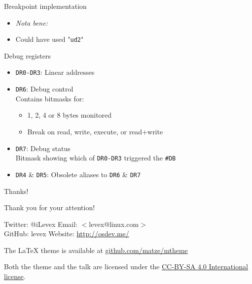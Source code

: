 \documentclass{beamer} %
\makeatletter
\newcommand*{\emailify}[1]{$<$#1$>$}
\newcommand*{\myemail}{\emailify{levex@linux.com}}
\makeatother
\begin{document}
\begin{frame}[<+- | textit@+>]{Breakpoint implementation}
\begin{itemize}
    \item<4->[] \textit{Nota bene:}
    \item<4-> Could have used "\texttt{ud2}"
\end{itemize}
\end{frame}

\begin{frame}{Debug registers}
\begin{itemize}
    \item<1-> \texttt{DR0\hspace{1mm}-\hspace{1mm}DR3}: Linear addresses
    \item<2-> \texttt{DR6}: Debug control\\
        Contains bitmasks for:
        \begin{itemize}
            \item 1, 2, 4 or 8 bytes monitored
            \item Break on read, write, execute, or read+write
        \end{itemize}
    \item<3-> \texttt{DR7}: Debug status \\
        Bitmask showing which of \texttt{DR0-DR3} triggered the \texttt{\#DB}
    \item<4-> \small \texttt{DR4} \& \texttt{DR5}: Obsolete aliases to \texttt{DR6} \& \texttt{DR7}
\end{itemize}
\end{frame}

\begin{frame}{Thanks!}
\begin{center}
Thank you for your attention! \par
\end{center}

Twitter: @iLevex \hfill Email: \myemail \\
GitHub: levex \hfill Website: \url{http://osdev.me/}

\vspace{1cm}

\begin{small}
The \LaTeX\hskip1mm theme is available at \url{github.com/matze/mtheme}

Both the theme and the talk are licensed under the
\href{http://creativecommons.org/licenses/by-sa/4.0/}{CC-BY-SA 4.0 International license}.

\end{small}

\end{frame}
\end{document}
